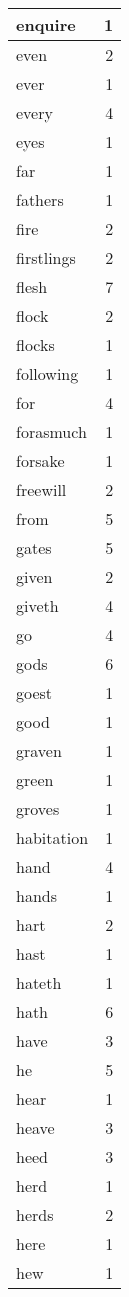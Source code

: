 \begin{center}
\begin{longtable}{l|r}
enquire & 1 \\ \hline
even & 2 \\ \hline
ever & 1 \\ \hline
every & 4 \\ \hline
eyes & 1 \\ \hline
far & 1 \\ \hline
fathers & 1 \\ \hline
fire & 2 \\ \hline
firstlings & 2 \\ \hline
flesh & 7 \\ \hline
flock & 2 \\ \hline
flocks & 1 \\ \hline
following & 1 \\ \hline
for & 4 \\ \hline
forasmuch & 1 \\ \hline
forsake & 1 \\ \hline
freewill & 2 \\ \hline
from & 5 \\ \hline
gates & 5 \\ \hline
given & 2 \\ \hline
giveth & 4 \\ \hline
go & 4 \\ \hline
gods & 6 \\ \hline
goest & 1 \\ \hline
good & 1 \\ \hline
graven & 1 \\ \hline
green & 1 \\ \hline
groves & 1 \\ \hline
habitation & 1 \\ \hline
hand & 4 \\ \hline
hands & 1 \\ \hline
hart & 2 \\ \hline
hast & 1 \\ \hline
hateth & 1 \\ \hline
hath & 6 \\ \hline
have & 3 \\ \hline
he & 5 \\ \hline
hear & 1 \\ \hline
heave & 3 \\ \hline
heed & 3 \\ \hline
herd & 1 \\ \hline
herds & 2 \\ \hline
here & 1 \\ \hline
hew & 1 \\ \hline

\end{longtable}
\end{center}
